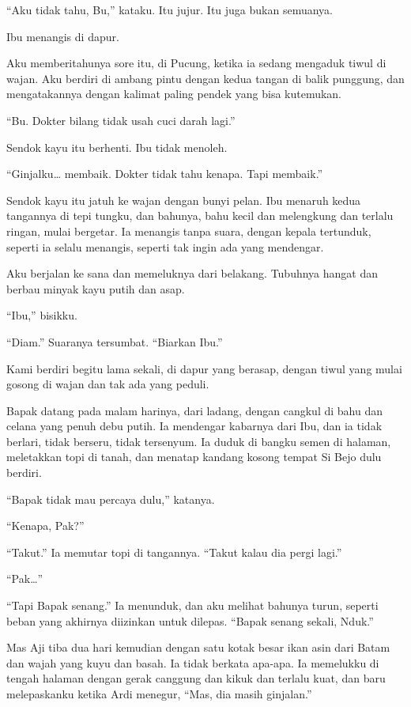 \documentclass[11pt,twoside,openany]{book}
\makeatletter
\newcommand{\scenebreak}{\par\vspace{0.9em}{\centering\textsc{*\hspace{0.7em}*\hspace{0.7em}*}\par}\vspace{0.9em}\@afterindentfalse\@afterheading}
\makeatother
\begin{document}
``Aku tidak tahu, Bu,'' kataku. Itu jujur. Itu juga bukan semuanya.

\scenebreak
Ibu menangis di dapur.

Aku memberitahunya sore itu, di Pucung, ketika ia sedang mengaduk tiwul di wajan. Aku berdiri di ambang pintu dengan kedua tangan di balik punggung, dan mengatakannya dengan kalimat paling pendek yang bisa kutemukan.

``Bu. Dokter bilang tidak usah cuci darah lagi.''

Sendok kayu itu berhenti. Ibu tidak menoleh.

``Ginjalku\ldots{} membaik. Dokter tidak tahu kenapa. Tapi membaik.''

Sendok kayu itu jatuh ke wajan dengan bunyi pelan. Ibu menaruh kedua tangannya di tepi tungku, dan bahunya, bahu kecil dan melengkung dan terlalu ringan, mulai bergetar. Ia menangis tanpa suara, dengan kepala tertunduk, seperti ia selalu menangis, seperti tak ingin ada yang mendengar.

Aku berjalan ke sana dan memeluknya dari belakang. Tubuhnya hangat dan berbau minyak kayu putih dan asap.

``Ibu,'' bisikku.

``Diam.'' Suaranya tersumbat. ``Biarkan Ibu.''

Kami berdiri begitu lama sekali, di dapur yang berasap, dengan tiwul yang mulai gosong di wajan dan tak ada yang peduli.

Bapak datang pada malam harinya, dari ladang, dengan cangkul di bahu dan celana yang penuh debu putih. Ia mendengar kabarnya dari Ibu, dan ia tidak berlari, tidak berseru, tidak tersenyum. Ia duduk di bangku semen di halaman, meletakkan topi di tanah, dan menatap kandang kosong tempat Si Bejo dulu berdiri.

``Bapak tidak mau percaya dulu,'' katanya.

``Kenapa, Pak?''

``Takut.'' Ia memutar topi di tangannya. ``Takut kalau dia pergi lagi.''

``Pak\ldots{}''

``Tapi Bapak senang.'' Ia menunduk, dan aku melihat bahunya turun, seperti beban yang akhirnya diizinkan untuk dilepas. ``Bapak senang sekali, Nduk.''

Mas Aji tiba dua hari kemudian dengan satu kotak besar ikan asin dari Batam dan wajah yang kuyu dan basah. Ia tidak berkata apa-apa. Ia memelukku di tengah halaman dengan gerak canggung dan kikuk dan terlalu kuat, dan baru melepaskanku ketika Ardi menegur, ``Mas, dia masih ginjalan.''
\end{document}

